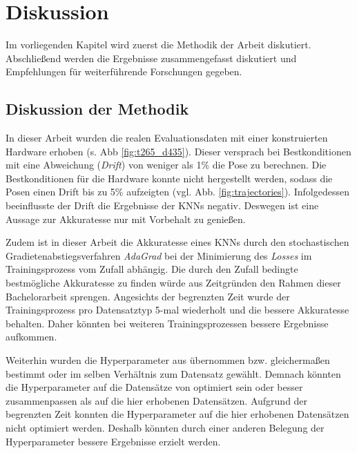 
\section{Diskussion}
\label{sec:kapitel_5}
Im vorliegenden Kapitel wird zuerst die Methodik der Arbeit diskutiert. Abschließend werden die Ergebnisse zusammengefasst diskutiert und Empfehlungen für weiterführende Forschungen gegeben. 


\subsection{Diskussion der Methodik}
\label{subsec:disc_methode}

In dieser Arbeit wurden die realen Evaluationsdaten mit einer konstruierten Hardware erhoben (s. Abb \ref{fig:t265_d435}). Dieser versprach bei Bestkonditionen mit eine Abweichung (\textit{Drift}) von weniger als 1\% die Pose zu berechnen. Die Bestkonditionen für die Hardware konnte nicht hergestellt werden, sodass die Posen einen Drift bis zu 5\% aufzeigten (vgl. Abb. \ref{fig:trajectories}). Infolgedessen beeinflusste der Drift die Ergebnisse der KNNs negativ. Deswegen ist eine Aussage zur Akkuratesse nur mit Vorbehalt zu genießen.


Zudem ist in dieser Arbeit die Akkuratesse eines KNNs durch den stochastischen Gradietenabstiegsverfahren \textit{AdaGrad} bei der Minimierung des \textit{Losses} im Trainingsprozess vom Zufall abhängig. Die durch den Zufall bedingte bestmögliche Akkuratesse zu finden würde aus Zeitgründen den Rahmen dieser Bachelorarbeit sprengen. Angesichts der begrenzten Zeit wurde der Trainingsprozess pro Datensatztyp 5-mal wiederholt und die bessere Akkuratesse behalten. Daher könnten bei weiteren Trainingsprozessen bessere Ergebnisse aufkommen.

Weiterhin wurden die Hyperparameter aus \citet{acharyaBIMPoseNetIndoorCamera2019} übernommen bzw. gleichermaßen bestimmt oder im selben Verhältnis zum Datensatz gewählt. Demnach könnten die Hyperparameter auf die Datensätze von \citet{acharyaBIMPoseNetIndoorCamera2019} optimiert sein oder besser zusammenpassen als auf die hier erhobenen Datensätzen. Aufgrund der begrenzten Zeit konnten die Hyperparameter auf die hier erhobenen Datensätzen nicht optimiert werden. Deshalb könnten durch einer anderen Belegung der Hyperparameter bessere Ergebnisse erzielt werden.

